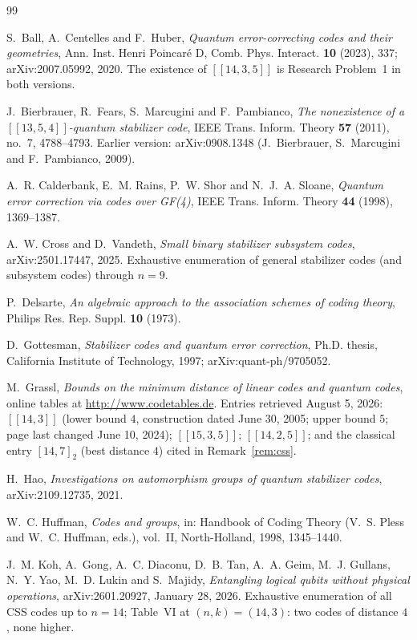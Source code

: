 \documentclass[11pt]{amsart}
\theoremstyle{plain}
\theoremstyle{definition}
\theoremstyle{remark}
\begin{document}
\begin{thebibliography}{99}

S.~Ball, A.~Centelles and F.~Huber,
\emph{Quantum error-correcting codes and their geometries},
Ann. Inst. Henri Poincar\'e D, Comb. Phys. Interact. \textbf{10} (2023),
337; arXiv:2007.05992, 2020. The existence of $[[14,3,5]]$ is Research
Problem~1 in both versions.

J.~Bierbrauer, R.~Fears, S.~Marcugini and F.~Pambianco,
\emph{The nonexistence of a $[[13,5,4]]$-quantum stabilizer code},
IEEE Trans. Inform. Theory \textbf{57} (2011), no.~7, 4788--4793.
Earlier version: arXiv:0908.1348 (J.~Bierbrauer, S.~Marcugini and
F.~Pambianco, 2009).

A.~R. Calderbank, E.~M. Rains, P.~W. Shor and N.~J.~A. Sloane,
\emph{Quantum error correction via codes over GF(4)},
IEEE Trans. Inform. Theory \textbf{44} (1998), 1369--1387.

A.~W. Cross and D.~Vandeth,
\emph{Small binary stabilizer subsystem codes},
arXiv:2501.17447, 2025. Exhaustive enumeration of general stabilizer
codes (and subsystem codes) through $n=9$.

P.~Delsarte,
\emph{An algebraic approach to the association schemes of coding theory},
Philips Res. Rep. Suppl. \textbf{10} (1973).

D.~Gottesman,
\emph{Stabilizer codes and quantum error correction},
Ph.D. thesis, California Institute of Technology, 1997;
arXiv:quant-ph/9705052.

M.~Grassl,
\emph{Bounds on the minimum distance of linear codes and quantum codes},
online tables at \url{http://www.codetables.de}. Entries retrieved
August 5, 2026: $[[14,3]]$ (lower bound $4$, construction dated June 30,
2005; upper bound $5$; page last changed June 10, 2024); $[[15,3,5]]$;
$[[14,2,5]]$; and the classical entry $[14,7]_{2}$ (best distance $4$)
cited in Remark~\ref{rem:css}.

H.~Hao,
\emph{Investigations on automorphism groups of quantum stabilizer codes},
arXiv:2109.12735, 2021.

W.~C. Huffman,
\emph{Codes and groups},
in: Handbook of Coding Theory (V.~S. Pless and W.~C. Huffman, eds.),
vol.~II, North-Holland, 1998, 1345--1440.

J.~M. Koh, A.~Gong, A.~C. Diaconu, D.~B. Tan, A.~A. Geim, M.~J. Gullans,
N.~Y. Yao, M.~D. Lukin and S.~Majidy,
\emph{Entangling logical qubits without physical operations},
arXiv:2601.20927, January 28, 2026. Exhaustive enumeration of all CSS
codes up to $n=14$; Table~VI at $(n,k)=(14,3)$: two codes of distance
$4$, none higher.


\end{thebibliography}
\end{document}
